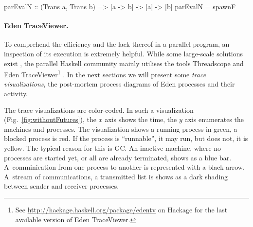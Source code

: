 \begin{code}
parEvalN :: (Trans a, Trans b) => [a -> b] -> [a] -> [b]
parEvalN = spawnF 
\end{code}

\paragraph{Eden TraceViewer.}
\label{sec:edentv}
To comprehend the efficiency and the lack thereof in a parallel program, an inspection of its execution is extremely helpful. While some large-scale solutions exist \cite{Geimer2010}, the parallel Haskell community mainly utilises the tools Threadscope \cite{Wheeler2009} and Eden TraceViewer\footnote{See \url{http://hackage.haskell.org/package/edentv} on Hackage for the last available version of Eden TraceViewer.} \cite{Berthold2007a}. In the next sections we will present some \emph{trace visualizations}, the post-mortem process diagrams of Eden processes and their activity.

The trace visualizations are color-coded. In such a visualization (Fig.~\ref{fig:withoutFutures}), the $x$ axis shows the time, the $y$ axis enumerates the machines and processes. The visualization shows a running process in green, a blocked process is red. If the process is \enquote{runnable}, \ie it may run, but does not, it is yellow. The typical reason for this is GC. An inactive machine, where no processes are started yet, or all are already terminated, shows as a blue bar. A~comminication from one process to another is represented with a black arrow. A~stream of communications, \eg a transmitted list is shows as a dark shading between sender and receiver processes.


